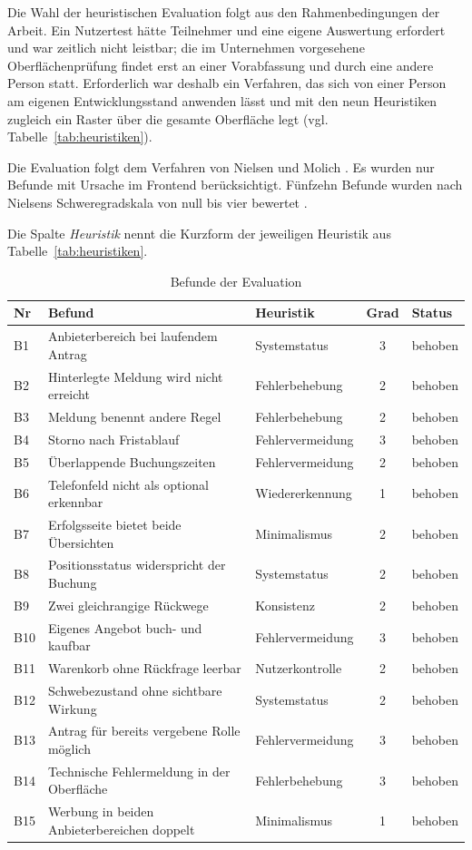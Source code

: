 Die Wahl der heuristischen Evaluation folgt aus den Rahmenbedingungen
der Arbeit. Ein Nutzertest hätte Teilnehmer und eine eigene Auswertung
erfordert und war zeitlich nicht leistbar; die im Unternehmen
vorgesehene Oberflächenprüfung findet erst an einer Vorabfassung und
durch eine andere Person statt. Erforderlich war deshalb ein
Verfahren, das sich von einer Person am eigenen Entwicklungsstand
anwenden lässt und mit den neun Heuristiken zugleich ein Raster über
die gesamte Oberfläche legt (vgl. Tabelle~\ref{tab:heuristiken}).

Die Evaluation folgt dem Verfahren von Nielsen und Molich
\cite{nielsen_molich_heuristic, nielsen_explanatory_power}. Es wurden
nur Befunde mit Ursache im Frontend berücksichtigt. Fünfzehn Befunde
wurden nach Nielsens Schweregradskala von null bis vier bewertet
\cite{nielsen_explanatory_power}.

Die Spalte \textit{Heuristik} nennt die Kurzform der jeweiligen
Heuristik aus Tabelle~\ref{tab:heuristiken}.

\begin{table}[H]
\centering
\caption{Befunde der Evaluation}
\label{tab:befunde}
\small
\begin{tabular}{|l|p{4.6cm}|p{3.1cm}|c|l|}
\hline
\textbf{Nr} & \textbf{Befund} & \textbf{Heuristik} & \textbf{Grad} & \textbf{Status} \\
\hline
B1 & Anbieterbereich bei laufendem Antrag & Systemstatus & 3 & behoben \\
\hline
B2 & Hinterlegte Meldung wird nicht erreicht & Fehlerbehebung & 2 & behoben \\
\hline
B3 & Meldung benennt andere Regel & Fehlerbehebung & 2 & behoben \\
\hline
B4 & Storno nach Fristablauf & Fehlervermeidung & 3 & behoben \\
\hline
B5 & Überlappende Buchungszeiten & Fehlervermeidung & 2 & behoben \\
\hline
B6 & Telefonfeld nicht als optional erkennbar & Wiedererkennung & 1 & behoben \\
\hline
B7 & Erfolgsseite bietet beide Übersichten & Minimalismus & 2 & behoben \\
\hline
B8 & Positionsstatus widerspricht der Buchung & Systemstatus & 2 & behoben \\
\hline
B9 & Zwei gleichrangige Rückwege & Konsistenz & 2 & behoben \\
\hline
B10 & Eigenes Angebot buch- und kaufbar & Fehlervermeidung & 3 & behoben \\
\hline
B11 & Warenkorb ohne Rückfrage leerbar & Nutzerkontrolle & 2 & behoben \\
\hline
B12 & Schwebezustand ohne sichtbare Wirkung & Systemstatus & 2 & behoben \\
\hline
B13 & Antrag für bereits vergebene Rolle möglich & Fehlervermeidung & 3 & behoben \\
\hline
B14 & Technische Fehlermeldung in der Oberfläche & Fehlerbehebung & 3 & behoben \\
\hline
B15 & Werbung in beiden Anbieterbereichen doppelt & Minimalismus & 1 & behoben \\
\hline
\end{tabular}
\end{table}

